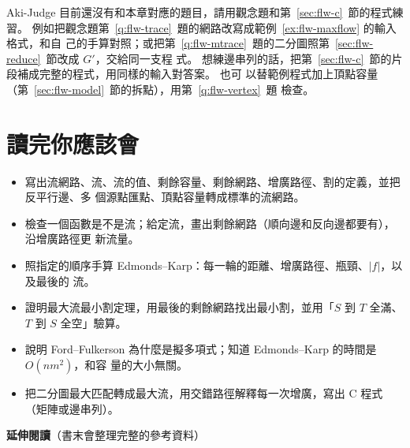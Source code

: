 Aki-Judge 目前還沒有和本章對應的題目，請用觀念題和第~\ref{sec:flw-c}~節的程式練習。
例如把觀念題第~\ref{q:flw-trace}~題的網路改寫成範例~\ref{ex:flw-maxflow} 的輸入格式，和自
己的手算對照；或把第~\ref{q:flw-mtrace}~題的二分圖照第~\ref{sec:flw-reduce}~節改成 $G'$，交給同一支程
式。 想練邊串列的話，把第~\ref{sec:flw-c}~節的片段補成完整的程式，用同樣的輸入對答案。 也可
以替範例程式加上頂點容量（第~\ref{sec:flw-model}~節的拆點），用第~\ref{q:flw-vertex}~題
檢查。

\section{讀完你應該會}
\label{sec:flw-checklist}

\begin{itemize}
\item 寫出流網路、流、流的值、剩餘容量、剩餘網路、增廣路徑、割的定義，並把反平行邊、多
個源點匯點、頂點容量轉成標準的流網路。
\item 檢查一個函數是不是流；給定流，畫出剩餘網路（順向邊和反向邊都要有），沿增廣路徑更
新流量。
\item 照指定的順序手算 Edmonds--Karp：每一輪的距離、增廣路徑、瓶頸、$|f|$，以及最後的
流。
\item 證明最大流最小割定理，用最後的剩餘網路找出最小割，並用「$S$ 到 $T$ 全滿、$T$ 到 $S$
全空」驗算。
\item 說明 Ford--Fulkerson 為什麼是擬多項式；知道 Edmonds--Karp 的時間是 $O(nm^2)$，和容
量的大小無關。
\item 把二分圖最大匹配轉成最大流，用交錯路徑解釋每一次增廣，寫出 C 程式（矩陣或邊串列）。
\end{itemize}

\textbf{延伸閱讀}（書末會整理完整的參考資料）

